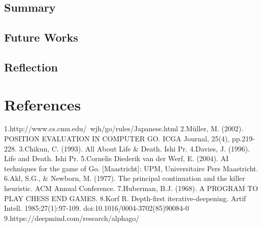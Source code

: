 \documentclass{l4proj}
\begin{document}
\section{Summary}

\section{Future Works}

\section{Reflection}


\chapter{References}
1.http://www.cs.cmu.edu/~wjh/go/rules/Japanese.html
2.Müller, M. (2002). POSITION EVALUATION IN COMPUTER GO. ICGA Journal, 25(4), pp.219-228.
3.Chikun, C. (1993). All About Life \& Death. Ishi Pr.
4.Davies, J. (1996). Life and Death. Ishi Pr.
5.Cornelis Diederik van der Werf, E. (2004). AI techniques for the game of Go. [Maastricht]: UPM, Universitaire Pers Maastricht.
6.Akl, S.G., \& Newborn, M. (1977). The principal continuation and the killer heuristic. ACM Annual Conference.
7.Huberman, B.J. (1968). A PROGRAM TO PLAY CHESS END GAMES.
8.Korf R. Depth-first iterative-deepening. Artif Intell. 1985;27(1):97-109. doi:10.1016/0004-3702(85)90084-0
9.https://deepmind.com/research/alphago/
\end{document}
